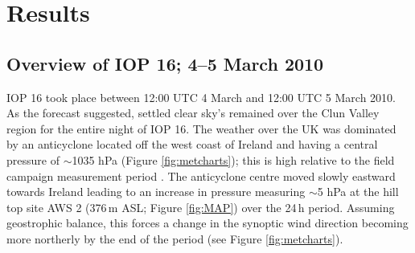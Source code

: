 \documentclass[times]{qjrms4}
\begin{document}
\section{Results}
\subsection{Overview of IOP 16; 4--5 March 2010}
IOP 16 took place between 12:00 UTC 4 March and 12:00 UTC 5 March 2010. As the forecast suggested, settled clear sky's remained over the Clun Valley region for the entire night of IOP 16. The weather over the UK was dominated by an anticyclone located off the west coast of Ireland and having a central pressure of $\sim$1035 hPa (Figure \ref{fig:metcharts}); this is high relative to the field campaign measurement period \citep[p 93]{jemmett2014thesis}. The anticyclone centre moved slowly eastward towards Ireland leading to an increase in pressure measuring $\sim$5 hPa at the hill top site AWS 2 (376$\,\mbox{m}$ ASL; Figure \ref{fig:MAP}) over the 24$\,\mbox{h}$ period. Assuming geostrophic balance, this forces a change in the synoptic wind direction becoming more northerly by the end of the period (see Figure \ref{fig:metcharts}).
\end{document}
